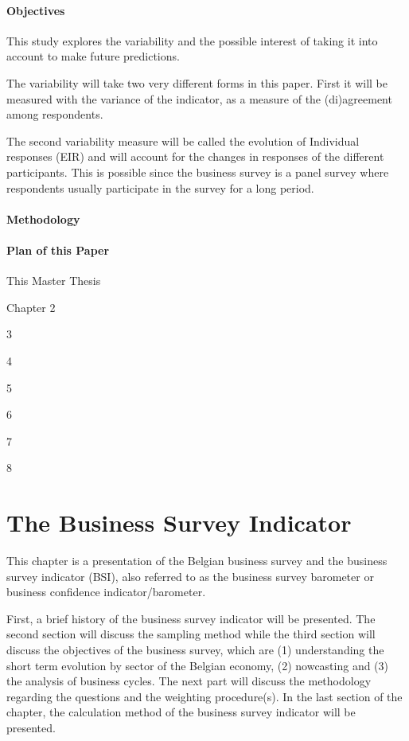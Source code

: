 \documentclass[12pt,a4paper,oneside]{book}
\begin{document}
\subsubsection{Objectives}

This study explores the variability and the possible interest of taking it into account to make future predictions.

The variability will take two very different forms in this paper. 
First it will be measured with the variance of the indicator, as a measure of the (di)agreement among respondents.

The second variability measure will be called the evolution of Individual responses (EIR) and will account for the changes in responses of the different participants. This is possible since the business survey is a panel survey where respondents usually participate in the survey for a long period.

\subsubsection{Methodology}

\subsubsection{Plan of this Paper}

This Master Thesis

Chapter 2 

3

4

5

6

7

8



\chapter{The Business Survey Indicator}

This chapter is a presentation of the Belgian business survey and the business survey indicator (BSI), also referred to as the business survey barometer or business confidence indicator/barometer.

First, a brief history of the business survey indicator will be presented.
The second section will discuss the sampling method while the third section will discuss the objectives of the business survey, which are (1) understanding the short term evolution by sector of the Belgian economy, (2) nowcasting and (3) the analysis of business cycles.
The next part will discuss the methodology regarding the questions and the weighting procedure(s).
In the last section of the chapter, the calculation method of the business survey indicator will be presented.
\end{document}
